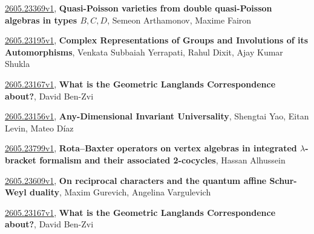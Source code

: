 \documentclass[9pt, a4paper]{article}
\theoremstyle{plain}
\theoremstyle{definition}
\theoremstyle{remark}
\newcommand{\arxiv}[3]{\href{https://arxiv.org/abs/#1}{#1}, \textbf{\textcolor{arxivblue}{#2}}, #3}
\begin{document}
\arxiv{2605.23369v1}{Quasi-Poisson varieties from double quasi-Poisson algebras in types $B,C,D$}{Semeon Arthamonov, Maxime Fairon}

\arxiv{2605.23195v1}{Complex Representations of Groups and Involutions of its Automorphisms}{Venkata Subbaiah Yerrapati, Rahul Dixit, Ajay Kumar Shukla}

\arxiv{2605.23167v1}{What is the Geometric Langlands Correspondence about?}{David Ben-Zvi}

\arxiv{2605.23156v1}{Any-Dimensional Invariant Universality}{Shengtai Yao, Eitan Levin, Mateo Díaz}

\arxiv{2605.23799v1}{Rota--Baxter operators on vertex algebras in integrated $λ$-bracket formalism and their associated 2-cocycles}{Hassan Alhussein}

\arxiv{2605.23609v1}{On reciprocal characters and the quantum affine Schur-Weyl duality}{Maxim Gurevich, Angelina Vargulevich}

\arxiv{2605.23167v1}{What is the Geometric Langlands Correspondence about?}{David Ben-Zvi}

\end{document}
